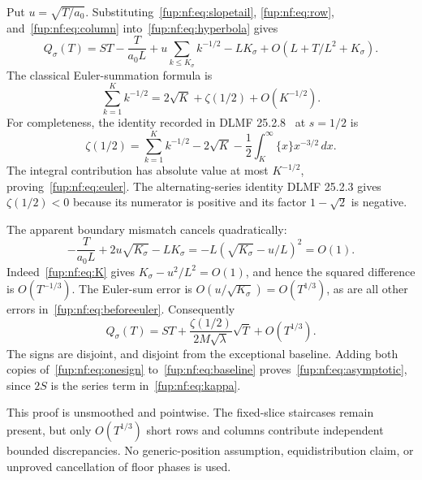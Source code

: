 \documentclass[11pt,letterpaper]{article}
\theoremstyle{definition}\newtheorem{definition}[theorem]{Definition}
\theoremstyle{remark}\newtheorem{remark}[theorem]{Remark}
\begin{document}
Put $u=\sqrt{T/a_0}$. Substituting~\eqref{fup:nf:eq:slopetail}, \eqref{fup:nf:eq:row}, and~\eqref{fup:nf:eq:column} into~\eqref{fup:nf:eq:hyperbola} gives
\begin{equation}\label{fup:nf:eq:beforeeuler}
 Q_\sigma(T)=ST-\frac{T}{a_0L}
 +u\sum_{k\le K_\sigma}k^{-1/2}-LK_\sigma
 +O(L+T/L^2+K_\sigma).
\end{equation}
The classical Euler-summation formula is
\begin{equation}\label{fup:nf:eq:euler}
 \sum_{k=1}^K k^{-1/2}=2\sqrt K+\zeta(1/2)+O(K^{-1/2}).
\end{equation}
For completeness, the identity recorded in DLMF 25.2.8~\cite{fup:nf:dlmf} at $s=1/2$ is
\[
 \zeta(1/2)=\sum_{k=1}^K k^{-1/2}-2\sqrt K
 -\frac12\int_K^\infty\{x\}x^{-3/2}\,dx.
\]
The integral contribution has absolute value at most $K^{-1/2}$, proving~\eqref{fup:nf:eq:euler}. The alternating-series identity DLMF 25.2.3 gives $\zeta(1/2)<0$ because its numerator is positive and its factor $1-\sqrt2$ is negative.

The apparent boundary mismatch cancels quadratically:
\begin{equation}\label{fup:nf:eq:cancel}
 -\frac{T}{a_0L}+2u\sqrt{K_\sigma}-LK_\sigma
 =-L\left(\sqrt{K_\sigma}-u/L\right)^2=O(1).
\end{equation}
Indeed~\eqref{fup:nf:eq:K} gives $K_\sigma-u^2/L^2=O(1)$, and hence the squared difference is $O(T^{-1/3})$. The Euler-sum error is $O(u/\sqrt{K_\sigma})=O(T^{1/3})$, as are all other errors in~\eqref{fup:nf:eq:beforeeuler}. Consequently
\begin{equation}\label{fup:nf:eq:onesign}
 Q_\sigma(T)=ST+
 \frac{\zeta(1/2)}{2M\sqrt\lambda}\sqrt T+O(T^{1/3}).
\end{equation}
The signs are disjoint, and disjoint from the exceptional baseline. Adding both copies of~\eqref{fup:nf:eq:onesign} to~\eqref{fup:nf:eq:baseline} proves~\eqref{fup:nf:eq:asymptotic}, since $2S$ is the series term in~\eqref{fup:nf:eq:kappa}.

This proof is unsmoothed and pointwise. The fixed-slice staircases remain present, but only $O(T^{1/3})$ short rows and columns contribute independent bounded discrepancies. No generic-position assumption, equidistribution claim, or unproved cancellation of floor phases is used.
\end{document}
